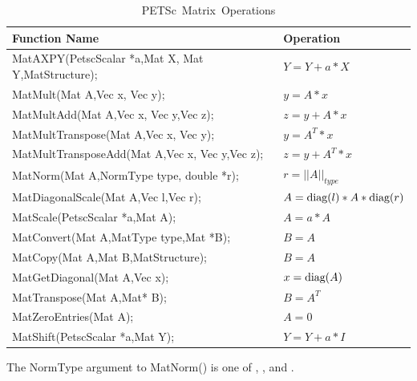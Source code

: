 \begin{table}[tb]
\begin{center}
\begin{tabular}{ll}
{\bf Function Name} & {\bf Operation} \\
\hline
MatAXPY(PetscScalar *a,Mat X, Mat Y,MatStructure); & $ Y = Y + a*X $ \\
MatMult(Mat A,Vec x, Vec y); & $ y = A*x $ \\
MatMultAdd(Mat A,Vec x, Vec y,Vec z); & $ z = y + A*x $ \\
MatMultTranspose(Mat A,Vec x, Vec y); & $ y = A^{T}*x $ \\
MatMultTransposeAdd(Mat A,Vec x, Vec y,Vec z); & $ z = y + A^{T}*x $ \\
MatNorm(Mat A,NormType type,  double *r); & $ r = ||A||_{type}$ \\
MatDiagonalScale(Mat A,Vec l,Vec r); & $ A = \hbox{diag}(l)*A*\hbox{diag}(r) $ \\
MatScale(PetscScalar *a,Mat A); & $ A = a*A $ \\
MatConvert(Mat A,MatType type,Mat *B); & $ B = A $ \\
MatCopy(Mat A,Mat B,MatStructure); &  $ B = A $ \\
MatGetDiagonal(Mat A,Vec x); & $ x = \hbox{diag}(A)$ \\
MatTranspose(Mat A,Mat* B); & $ B = A^{T} $ \\
MatZeroEntries(Mat A); & $ A = 0 $ \\
MatShift(PetscScalar *a,Mat Y); & $ Y =  Y + a*I $ \\
\hline 
\end{tabular}
\end{center}
\caption{\hbox{PETSc Matrix Operations}}
\label{fig_matrixops}
\end{table}
The NormType argument to MatNorm() is one of 
 , , and .
   
  
